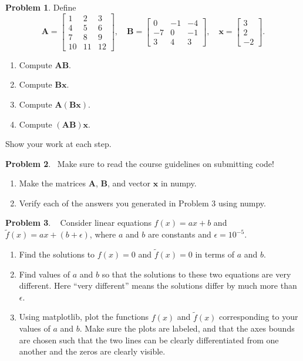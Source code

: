 \documentclass[12pt]{article}
\theoremstyle{definition}
\newtheorem{problem}{Problem}
\renewcommand{\vec}{\mathbf}
\begin{document}
\begin{problem}
Define 
\begin{equation*}
    \vec{A} = \begin{bmatrix} 1 & 2 & 3 \\ 4 & 5 & 6 \\ 7 & 8 & 9 \\ 10 & 11 & 12\end{bmatrix}
    ,\quad
    \vec{B} = \begin{bmatrix} 0 & -1 & -4 \\ -7 & 0 & -1 \\ 3 & 4 & 3\end{bmatrix}
    ,\quad
    \vec{x} = \begin{bmatrix} 3 \\ 2 \\ -2\end{bmatrix}.
\end{equation*}

    \begin{enumerate}
        \item Compute $\vec{A} \vec{B}$.
        \item Compute $\vec{B} \vec{x}$.
        \item Compute $\vec{A} (\vec{B} \vec{x})$.
        \item Compute $(\vec{A}\vec{B}) \vec{x}$.
    \end{enumerate}
Show your work at each step.
\end{problem}

\clearpage
\begin{problem}~Make sure to read the course guidelines on submitting code!
\begin{enumerate}
    \item Make the matrices $\vec{A}$, $\vec{B}$, and vector $\vec{x}$ in numpy.
    \item Verify each of the answers you generated in Problem 3 using numpy. 
\end{enumerate}
\end{problem}

\begin{problem}~
    Consider linear equations $f(x) = a x + b$ and $\tilde{f}(x) = a x + (b+\epsilon)$, where $a$ and $b$ are constants and $\epsilon = 10^{-5}$.
    \begin{enumerate}
        \item Find the solutions to $f(x) = 0$ and $\tilde{f}(x) = 0$ in terms of $a$ and $b$.
        \item Find values of $a$ and $b$ so that the solutions to these two equations are very different. Here ``very different'' means the solutions differ by much more than $\epsilon$.
        \item Using matplotlib, plot the functions $f(x)$ and $\tilde{f}(x)$ corresponding to your values of $a$ and $b$.
        Make sure the plots are labeled, and that the axes bounds are chosen such that the two lines can be clearly differentiated from one another and the zeros are clearly visible.
    \end{enumerate}
\end{problem}
\end{document}
